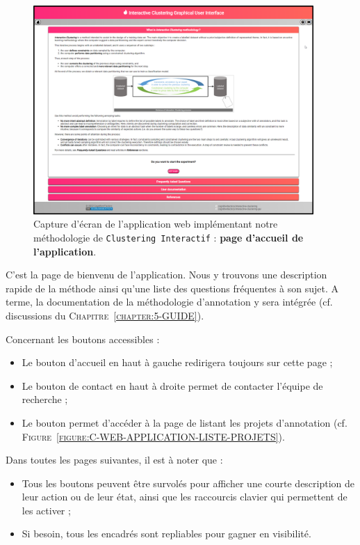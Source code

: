 		\begin{figure}[H]
			\centering
			\includegraphics[width=0.95\textwidth]{figures/interactive-clustering-application-accueil-application}
			\caption{
				Capture d'écran de l'application web implémentant notre méthodologie de \texttt{Clustering Interactif} : \textbf{page d'accueil de l'application}.
			}
			\label{figure:C-WEB-APPLICATION-ACCUEIL}
		\end{figure}
		
		C'est la page de bienvenu de l'application.
		Nous y trouvons une description rapide de la méthode ainsi qu'une liste des questions fréquentes à son sujet.
		A terme, la documentation de la méthodologie d'annotation y sera intégrée (cf. discussions du \textsc{Chapitre~\ref{chapter:5-GUIDE}}).
		
		Concernant les boutons accessibles :
		\begin{itemize}
			\item Le bouton d'accueil en haut à gauche redirigera toujours sur cette page ;
			\item Le bouton de contact en haut à droite permet de contacter l'équipe de recherche ;
			\item Le bouton  permet d'accéder à la page de listant les projets d'annotation (cf. \textsc{Figure~\ref{figure:C-WEB-APPLICATION-LISTE-PROJETS}}).
		\end{itemize}
		
		\begin{leftBarInformation}
			Dans toutes les pages suivantes, il est à noter que :
			\begin{itemize}
				\item Tous les boutons peuvent être survolés pour afficher une courte description de leur action ou de leur état, ainsi que les raccourcis clavier qui permettent de les activer ;
				\item Si besoin, tous les encadrés sont repliables pour gagner en visibilité.
			\end{itemize}
		\end{leftBarInformation}
	
